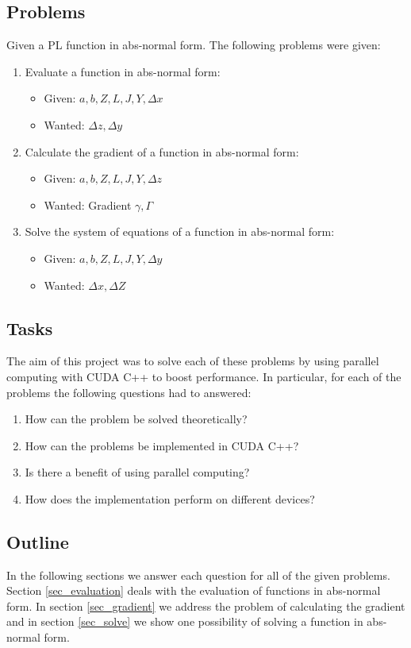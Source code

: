 \subsection{Problems}
Given a PL function in abs-normal form. The following problems were given:
\begin{enumerate}
	\item Evaluate a function in abs-normal form:
	\begin{itemize}
		\item Given: $a,b,Z,L,J,Y,\Delta x$
		\item Wanted: $\Delta z, \Delta y$
	\end{itemize}
	\item Calculate the gradient of a function in abs-normal form:
	\begin{itemize}
		\item Given: $a,b,Z,L,J,Y, \Delta z$
		\item Wanted: Gradient $\gamma, \Gamma$
	\end{itemize}
	\item Solve the system of equations of a function in abs-normal form:
	\begin{itemize}
		\item Given: $a,b,Z,L,J,Y,\Delta y$
		\item Wanted: $\Delta x, \Delta Z$
	\end{itemize}
\end{enumerate}

\subsection{Tasks}
The aim of this project was to solve each of these problems by using parallel computing with CUDA C++ to boost performance.
In particular, for each of the problems the following questions had to answered:
\begin{enumerate}[{(}I{)}]
	\item How can the problem be solved theoretically?
	\item How can the problems be implemented in CUDA C++?
	\item Is there a benefit of using parallel computing?
	\item How does the implementation perform on different devices?
\end{enumerate}

\subsection{Outline}
In the following sections we answer each question for all of the given problems.
Section \ref{sec_evaluation} deals with the evaluation of functions in abs-normal form. In section \ref{sec_gradient} we address the problem of calculating the gradient and in section \ref{sec_solve} we show one possibility of solving a function in abs-normal form.

